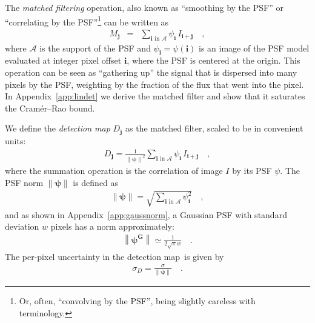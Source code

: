 \documentclass[11pt,letterpaper,linenumbers]{aastex7}
\newcommand{\appref}[1]{\mbox{Appendix~\ref{#1}}}
\newcommand{\detmap}{detection map}
\newcommand{\psf}{\psi}
\newcommand{\psfat}[1]{\psf_{#1}}
\newcommand{\psfnorm}{\norm{\bm{\psf}}}
\newcommand{\norm}[1]{\left\lVert #1 \right\rVert}
\newcommand{\psfw}{w}
\renewcommand{\vec}[1]{\boldsymbol{#1}}
\newcommand{\ivec}{\vec{i}}
\newcommand{\jvec}{\vec{j}}
\newcommand{\iina}{\ivec \,\, \mathrm{in} \,\, \mathcal{A}}
\newcommand{\sigd}{\sigma_{\scriptscriptstyle D}}
\begin{document}
The \emph{matched filtering} operation, also known as ``smoothing by
the PSF'' or ``correlating by the PSF''\footnote{
  Or, often, ``convolving by the PSF'', being slightly careless with terminology.}
can be written as
\begin{eqnarray}
  M_{\jvec} &=& \sum_{\iina} \psfat{\ivec} \, I_{\ivec + \jvec}
  \nonumber \quad ,
\end{eqnarray}
where $\mathcal{A}$ is the support of the PSF and $\psfat{\ivec} =
\psf(\ivec)$ is an image of the PSF model evaluated at integer pixel
offset $\ivec$, where the PSF is centered at the origin.  This
operation can be seen as ``gathering up'' the signal that is dispersed
into many pixels by the PSF, weighting by the fraction of the flux
that went into the pixel.  In \appref{app:lindet} we derive the
matched filter and show that it saturates the Cram\'er--Rao bound.





\linenumbers
We define the \emph{\detmap} $D_{\jvec}$ as the matched filter, scaled to be in convenient units:
\begin{eqnarray}
D_{\jvec} = \frac{1}{\psfnorm^2} \sum_{\iina} \psfat{\ivec} \,
I_{\ivec + \jvec} \quad ,
\label{eq:detmap}
\end{eqnarray}
where the summation operation is the correlation of image $I$ by its
PSF $\psf$.
The PSF norm $\psfnorm$ is defined as
\begin{eqnarray}
\psfnorm = \sqrt{\sum_{\iina} \psfat{\ivec}^2} \quad ,
\end{eqnarray}
and as shown in \appref{app:gaussnorm}, a Gaussian PSF with standard
deviation $\psfw$ pixels has a norm approximately:
\begin{eqnarray}
  \norm{\bm{\psf^G}} \simeq \frac{1}{2 \sqrt{\pi} \psfw} \quad .
\end{eqnarray}
The per-pixel uncertainty in the \detmap\ is given by
\begin{eqnarray}
\sigd = \frac{\sigma}{\psfnorm} \quad .
\end{eqnarray}
\end{document}
